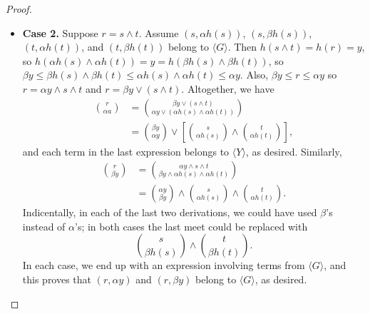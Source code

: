 \begin{proof}
\begin{itemize}
\item {\bf Case 2.} Suppose $r = s \wedge t$. Assume $(s, \alpha {h(s)})$, 
$(s, \beta{h(s)})$, $(t, \alpha {h(t)})$, and $(t, \beta{h(t)})$ belong 
to $\langle G \rangle$. Then $h(s\wedge t) = h(r) = y$, so 
$h(\alpha {h(s)} \wedge\alpha {h(t)}) = y = h(\beta {h(s)} \wedge\beta {h(t)})$, 
so $\beta y \leqslant \beta h(s) \wedge \beta h(t) \leqslant \alpha {h(s)} \wedge \alpha {h(t)} \leqslant \alpha y$.
Also, $\beta y \leqslant r \leqslant \alpha y$ so $r = \alpha y \wedge s\wedge t$
and $r = \beta y \vee (s\wedge t)$. Altogether, we have
\begin{align*}
\binom{r}{\alpha a} &= 
\binom{\beta y \vee (s\wedge t)}{\alpha y \vee (\alpha {h(s)} \wedge \alpha {h(t)})}\\
&= \binom{\beta y}{\alpha y} \vee
\left[\binom{s}{\alpha {h(s)}} \wedge \binom{t}{\alpha {h(t)}}\right],
\end{align*}
and each term in the last expression belongs to $\langle Y \rangle$, as desired.
Similarly,
\begin{align*}
\binom{r}{\beta y} &= 
\binom{\alpha y \wedge s\wedge t}{\beta y \wedge \alpha {h(s)} \wedge \alpha {h(t)}}\\
&= \binom{\alpha y}{\beta y} \wedge 
\binom{s}{\alpha {h(s)}} \wedge \binom{t}{\alpha {h(t)}}.
\end{align*}
Indicentally, in each of the last two derivations, we could have used $\beta$'s 
instead of $\alpha$'s; in both cases the last meet could be replaced with
\[
\binom{s}{\beta {h(s)}} \wedge \binom{t}{\beta {h(t)}}.
\]
In each case, we end up with an expression involving terms from $\langle G \rangle$, 
and this proves that $(r, \alpha y)$ and $(r, \beta y)$ belong to $\langle G \rangle$, as desired.
\end{itemize}
\end{proof}














